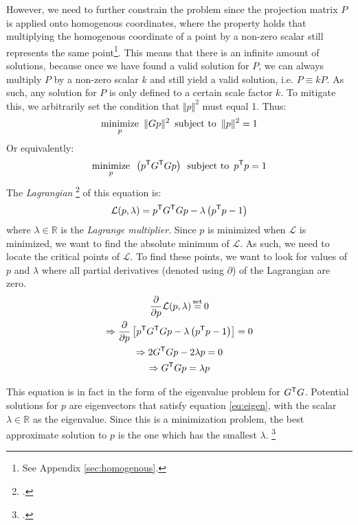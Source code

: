However, we need to further constrain the problem since the projection matrix $P$ is applied onto homogenous coordinates, where the property holds that multiplying the homogenous coordinate of a point by a non-zero scalar still represents the same point\footnote{See Appendix \ref{sec:homogenous}.}. This means that there is an infinite amount of solutions, because once we have found a valid solution for $P$, we can always multiply $P$ by a non-zero scalar $k$ and still yield a valid solution, i.e. $P \equiv kP$. As such, any solution for $P$ is only defined to a certain scale factor $k$. To mitigate this, we arbitrarily set the condition that $\Vert p \Vert^2$ must equal 1. Thus:
\begin{equation*} \label{eq:min1}
    \underset{p}{\text{minimize}}\enspace \lVert Gp \rVert^2 \enspace \text{subject to} \enspace \lVert p \rVert^2 = 1
\end{equation*}
Or equivalently:
\begin{equation} \label{eq:min2}
    \underset{p}{\text{minimize}}\enspace \left(p^{\mathsf{T}} G^{\mathsf{T}} Gp\right) \enspace \text{subject to} \enspace p^{\mathsf{T}} p = 1
\end{equation}
The \emph{Lagrangian} \footcite[][2]{ghojoghEigenvalueGeneralized2023} of this equation is:
\begin{equation}
    \mathcal{L}(p, \lambda) = p^{\mathsf{T}} G^{\mathsf{T}} Gp - \lambda \left( p^{\mathsf{T}} p - 1 \right)
\end{equation}
where $\lambda \in \mathbb{R}$ is the \emph{Lagrange multiplier}. Since $p$ is minimized when $\mathcal{L}$ is minimized, we want to find the absolute minimum of $\mathcal{L}$. As such, we need to locate the critical points of $\mathcal{L}$. To find these points, we want to look for values of $p$ and $\lambda$ where all partial derivatives (denoted using $\partial$) of the Lagrangian are zero.
\begin{gather}
    \frac{\partial}{\partial p}\mathcal{L}(p, \lambda) \seteq 0 \nonumber\\
    \Rightarrow \frac{\partial}{\partial p} \left[ p^\T G^\T Gp - \lambda \left( p^\T p - 1 \right) \right] = 0 \nonumber \\
    \Rightarrow 2G^\T Gp - 2 \lambda p = 0 \nonumber \\
    \Rightarrow G^\T Gp = \lambda p \label{eq:eigen}
\end{gather}

This equation is in fact in the form of the eigenvalue problem for $G^{\mathsf{T}} G$. Potential solutions for $p$ are eigenvectors that satisfy equation \ref{eq:eigen}, with the scalar $\lambda \in \mathbb{R}$ as the eigenvalue. Since this is a minimization problem, the best approximate solution to $p$ is the one which has the smallest $\lambda$. \footcite[][2]{ghojoghEigenvalueGeneralized2023}
